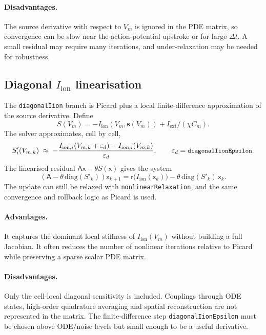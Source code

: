 \documentclass[11pt,a4paper]{article}
\newcommand{\Vm}{V_{m}}
\newcommand{\Iion}{I_{\text{ion}}}
\newcommand{\Iext}{I_{\text{ext}}}
\newcommand{\Aimp}{\mathsf{A}}
\newcommand{\code}[1]{\texttt{\small #1}}
\begin{document}
\paragraph{Disadvantages.}
The source derivative with respect to $\Vm$ is ignored in the PDE
matrix, so convergence can be slow near the action-potential upstroke or
for large $\Delta t$. A small residual may require many iterations, and
under-relaxation may be needed for robustness.

\subsection{Diagonal \texorpdfstring{$\Iion$}{Iion} linearisation}

The \code{diagonalIion} branch is Picard plus a local finite-difference
approximation of the source derivative. Define
\[
  S(\Vm) = -\Iion(\Vm,\mathbf{s}(\Vm)) + \Iext/(\chi C_m).
\]
The solver approximates, cell by cell,
\begin{equation}
  S'_i(V_{m,k})
  \;\approx\;
  -\frac{
      I_{\mathrm{ion},i}(V_{m,k}+\varepsilon_d)
      - I_{\mathrm{ion},i}(V_{m,k})
    }{\varepsilon_d},
  \qquad
  \varepsilon_d=\code{diagonalIionEpsilon}.
\end{equation}
The linearised residual
$\Aimp\mathsf{x}-\theta S(\mathsf{x})$ gives the system
\begin{equation}
  \left(\Aimp-\theta\,\mathrm{diag}(S'_k)\right)\mathsf{x}_{k+1}
  =
  \mathsf{r}\!\bigl(\Iion(\mathsf{x}_{k})\bigr)
  - \theta\,\mathrm{diag}(S'_k)\,\mathsf{x}_{k}.
  \label{eq:diagonalIion}
\end{equation}
The update can still be relaxed with \code{nonlinearRelaxation}, and
the same convergence and rollback logic as Picard is used.

\paragraph{Advantages.}
It captures the dominant local stiffness of $\Iion(\Vm)$ without
building a full Jacobian. It often reduces the number of nonlinear
iterations relative to Picard while preserving a sparse scalar PDE
matrix.

\paragraph{Disadvantages.}
Only the cell-local diagonal sensitivity is included. Couplings through
ODE states, high-order quadrature averaging and spatial reconstruction
are not represented in the matrix. The finite-difference step
\code{diagonalIionEpsilon} must be chosen above ODE/noise levels but
small enough to be a useful derivative.
\end{document}
